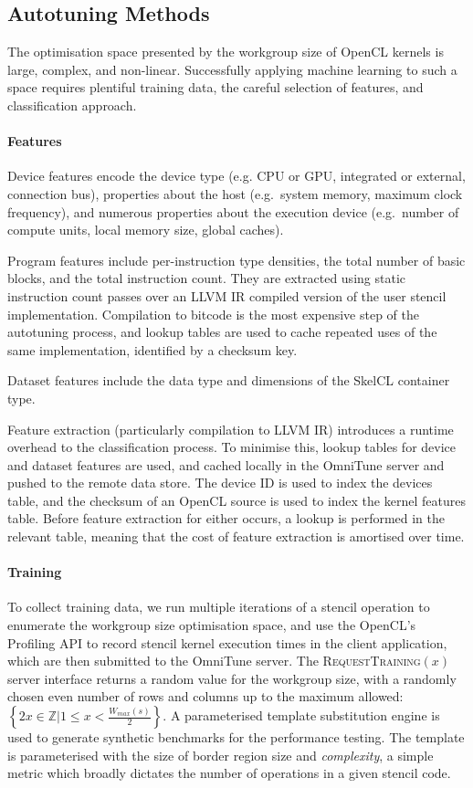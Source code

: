 \documentclass[nonatbib,preprint,9pt]{sigplanconf}
\begin{document}
\subsection{Autotuning Methods}

The optimisation space presented by the workgroup size of OpenCL
kernels is large, complex, and non-linear. Successfully applying
machine learning to such a space requires plentiful training data, the
careful selection of features, and classification approach.

\paragraph{Features} Device features encode the device type (e.g. CPU
or GPU, integrated or external, connection bus), properties about the
host (e.g.\ system memory, maximum clock frequency), and numerous
properties about the execution device (e.g.\ number of compute units,
local memory size, global caches).

Program features include per-instruction type densities, the total
number of basic blocks, and the total instruction count. They are
extracted using static instruction count passes over an LLVM IR
compiled version of the user stencil implementation. Compilation to
bitcode is the most expensive step of the autotuning process, and
lookup tables are used to cache repeated uses of the same
implementation, identified by a checksum key.

Dataset features include the data type and dimensions of the SkelCL
container type.

Feature extraction (particularly compilation to LLVM IR) introduces a
runtime overhead to the classification process. To minimise this,
lookup tables for device and dataset features are used, and cached
locally in the OmniTune server and pushed to the remote data
store. The device ID is used to index the devices table, and the
checksum of an OpenCL source is used to index the kernel features
table. Before feature extraction for either occurs, a lookup is
performed in the relevant table, meaning that the cost of feature
extraction is amortised over time.

\paragraph{Training} To collect training data, we run multiple
iterations of a stencil operation to enumerate the workgroup size
optimisation space, and use the OpenCL's Profiling API to record
stencil kernel execution times in the client application, which are
then submitted to the OmniTune server. The
\textsc{RequestTraining}$(x)$ server interface returns a random value
for the workgroup size, with a randomly chosen even number of rows and
columns up to the maximum allowed:
$\left\{ 2x \in \mathbb{Z} | 1 \le x < \frac{W_{max}(s)}{2} \right\}$.
A parameterised template substitution engine is used to generate
synthetic benchmarks for the performance testing. The template is
parameterised with the size of border region size and
\emph{complexity}, a simple metric which broadly dictates the number
of operations in a given stencil code.
\end{document}
